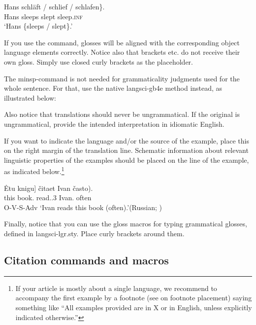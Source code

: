 \ea\label{sim:ex:german-verbs}\gll Hans \minsp{\{} schläft / schlief / \minsp{*} schlafen\}.\\
Hans {} sleeps {} slept {} {} sleep.\textsc{inf}\\
\glt `Hans \{sleeps / slept\}.'
\z

\noindent If you use the command, glosses will be aligned with the corresponding object language elements correctly. Notice also that brackets etc. do not receive their own gloss. Simply use closed curly brackets as the placeholder.

The minsp-command is not needed for grammaticality judgments used for the whole sentence. For that, use the native langsci-gb4e method instead, as illustrated below:

\z

\noindent Also notice that translations should never be ungrammatical. If the original is ungrammatical, provide the intended interpretation in idiomatic English.

If you want to indicate the language and/or the source of the example, place this on the right margin of the translation line. Schematic information about relevant linguistic properties of the examples should be placed on the line of the example, as indicated below.\footnote{If your article is mostly about a single language, we recommend to accompany the first example by a footnote (see  on footnote placement) saying something like ``All examples provided are in X or in English, unless explicitly indicated otherwise.''}

\ea\label{sim:ex:bailyn}\gll \minsp{[} Ėtu knigu] čitaet Ivan \minsp{(} často).\\
{} this book.{\ACC} read.{\PRS.3\SG} Ivan.{\NOM} {} often\\\hfill O-V-S-Adv
\glt `Ivan reads this book (often).'\hfill (Russian; \citealt[4]{Bailyn2004})
\z

\noindent Finally, notice that you can use the gloss macros for typing grammatical glosses, defined in langsci-lgr.sty. Place curly brackets around them.

\subsection{Citation commands and macros}

